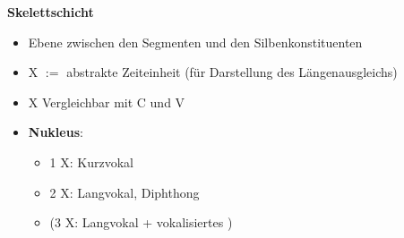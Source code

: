 
\begin{frame}

\textbf{Skelettschicht}

\begin{itemize}
	\item Ebene zwischen den Segmenten und den Silbenkonstituenten
	
	\item X $:=$ abstrakte Zeiteinheit (\zB für Darstellung des Längenausgleichs)
	
	\item X \ras Vergleichbar mit C und V

	\item \textbf{Nukleus}:
	
	\begin{itemize}
		\item 1 X: Kurzvokal
		\item 2 X: Langvokal, Diphthong
		\item (3 X: Langvokal + vokalisiertes \textipa{/\textscr /})
	\end{itemize}
	
\end{itemize}


\begin{minipage}{.325\textwidth}

%
\centering
{}

\end{minipage}
%
\begin{minipage}{.325\textwidth}
%
\centering
{}

\end{minipage}
%
\begin{minipage}{.325\textwidth}
%
\centering
{}

\end{minipage}


\end{frame}



